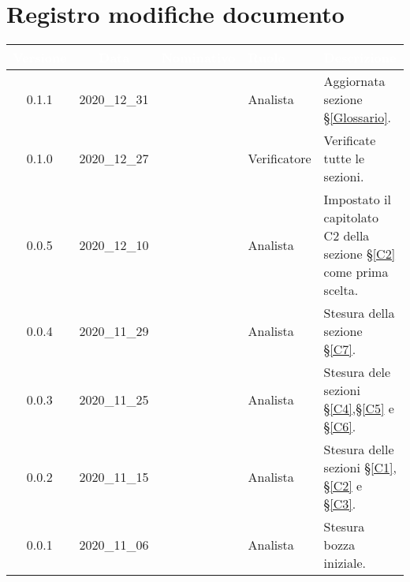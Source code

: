\section*{Registro modifiche documento}
{
\renewcommand{\arraystretch}{1.5}
\centering
\begin{longtable}{c c C{3cm} C{3cm} C{5cm}}


 \textcolor{white}{\textbf{Versione}} &
    \textcolor{white}{\textbf{Data}} &
    \textcolor{white}{\textbf{Nominativo}} &
    \textcolor{white}{\textbf{Ruolo}} &
    \textcolor{white}{\textbf{Descrizione}}\\	
    \endhead
    
    0.1.1 & 2020\_12\_31 & \TG{} & Analista & Aggiornata sezione \S\ref{Glossario}. \\
    
     0.1.0 & 2020\_12\_27 & \TG{} & Verificatore & Verificate tutte le sezioni. \\
    
    0.0.5 & 2020\_12\_10 & \FF{} & Analista & Impostato il capitolato C2 della sezione \S\ref{C2} come prima scelta.  \\

    0.0.4 & 2020\_11\_29 & \FF{} & Analista & Stesura della sezione \S\ref{C7}.  \\
    
    0.0.3 & 2020\_11\_25 & \FF{} & Analista & Stesura dele sezioni \S\ref{C4},\S \ref{C5} e \S\ref{C6}.  \\
    
    0.0.2 & 2020\_11\_15 & \FF{} & Analista & Stesura delle sezioni \S\ref{C1}, \S\ref{C2} e \S\ref{C3}.  \\
            
    0.0.1 & 2020\_11\_06 & \FF{} & Analista & Stesura bozza iniziale.  \\
			
\end{longtable}
}